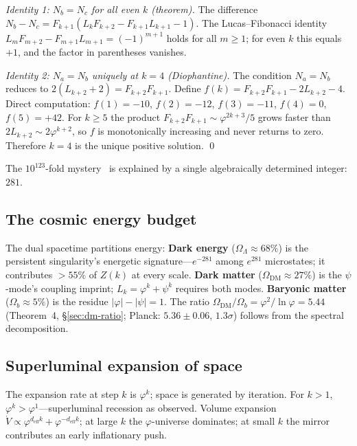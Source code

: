 \documentclass[12pt,a4paper]{article}
\begin{document}
\textit{Identity 1: $N_b = N_c$ for all even $k$ (theorem).}\; The difference $N_b - N_c = F_{k+1}(L_k F_{k+2} - F_{k+1} L_{k+1} - 1)$.  The Lucas--Fibonacci identity $L_m F_{m+2} - F_{m+1} L_{m+1} = (-1)^{m+1}$ holds for all $m \geq 1$; for even $k$ this equals $+1$, and the factor in parentheses vanishes.

\textit{Identity 2: $N_a = N_b$ uniquely at $k = 4$ (Diophantine).}\; The condition $N_a = N_b$ reduces to $2(L_{k+2} + 2) = F_{k+2} F_{k+1}$.  Define $f(k) = F_{k+2} F_{k+1} - 2L_{k+2} - 4$.  Direct computation: $f(1) = -10$, $f(2) = -12$, $f(3) = -11$, $f(4) = 0$, $f(5) = +42$.  For $k \geq 5$ the product $F_{k+2} F_{k+1} \sim \varphi^{2k+3}/5$ grows faster than $2L_{k+2} \sim 2\varphi^{k+2}$, so $f$ is monotonically increasing and never returns to zero.  Therefore $k = 4$ is the unique positive solution.  \qed

\noindent The $10^{123}$-fold mystery~\cite{Weinberg1989,Zeldovich1968} is explained by a single algebraically determined integer: $281$.

\subsection{The cosmic energy budget}
\label{sec:cosmic-budget}

The dual spacetime partitions energy: \textbf{Dark energy} ($\Omega_\Lambda \approx 68\%$) is the persistent singularity's energetic signature---$e^{-281}$ among $e^{281}$ microstates; it contributes $>55\%$ of $Z(k)$ at every scale. \textbf{Dark matter} ($\Omega_{\mathrm{DM}} \approx 27\%$) is the $\psi$-mode's coupling imprint; $L_k = \varphi^k + \psi^k$ requires both modes. \textbf{Baryonic matter} ($\Omega_b \approx 5\%$) is the residue $|\varphi| - |\psi| = 1$. The ratio $\Omega_{\mathrm{DM}}/\Omega_b = \varphi^2/\ln\varphi = 5.44$ (Theorem~4, \S\ref{sec:dm-ratio}; Planck: $5.36 \pm 0.06$, $1.3\sigma$) follows from the spectral decomposition.

\subsection{Superluminal expansion of space}
\label{sec:superluminal}

The expansion rate at step $k$ is $\varphi^k$; space is generated by iteration. For $k > 1$, $\varphi^k > \varphi^1$---superluminal recession as observed. Volume expansion $\dot{V} \propto \varphi^{d_{\mathrm{eff}}k} + \varphi^{-d_{\mathrm{eff}}k}$; at large $k$ the $\varphi$-universe dominates; at small $k$ the mirror contributes an early inflationary push.
\end{document}
